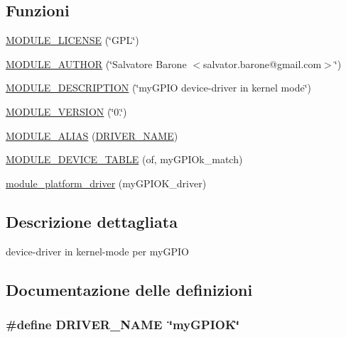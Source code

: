 \subsection*{Funzioni}
\begin{DoxyCompactItemize}
\item 
\hyperlink{group___kernel-module_gad94b36675e7eb067ea3ce6ff9e244a44}{M\+O\+D\+U\+L\+E\+\_\+\+L\+I\+C\+E\+N\+S\+E} (\char`\"{}G\+P\+L\char`\"{})
\item 
\hyperlink{group___kernel-module_gaa528ef168ff30340d38c46a12fce906b}{M\+O\+D\+U\+L\+E\+\_\+\+A\+U\+T\+H\+O\+R} (\char`\"{}Salvatore Barone $<$salvator.\+barone@gmail.\+com$>$\char`\"{})
\item 
\hyperlink{group___kernel-module_ga1a0de0abbfec8f65abc50ccd3a549a4d}{M\+O\+D\+U\+L\+E\+\_\+\+D\+E\+S\+C\+R\+I\+P\+T\+I\+O\+N} (\char`\"{}my\+G\+P\+I\+O device-\/driver in kernel mode\char`\"{})
\item 
\hyperlink{group___kernel-module_ga4b75c2cb371865e62f06fc635df9401e}{M\+O\+D\+U\+L\+E\+\_\+\+V\+E\+R\+S\+I\+O\+N} (\char`\"{}0.\char`\"{})
\item 
\hyperlink{group___kernel-module_ga1681c4acdb2692baf523dbf58f940399}{M\+O\+D\+U\+L\+E\+\_\+\+A\+L\+I\+A\+S} (\hyperlink{group___kernel-module_ga25634d21648ca7fb7a2aca614bafaaeb}{D\+R\+I\+V\+E\+R\+\_\+\+N\+A\+M\+E})
\item 
\hyperlink{group___kernel-module_ga4982cc224a0881ae5d106fce7526fb68}{M\+O\+D\+U\+L\+E\+\_\+\+D\+E\+V\+I\+C\+E\+\_\+\+T\+A\+B\+L\+E} (of, my\+G\+P\+I\+Ok\+\_\+match)
\item 
\hyperlink{group___kernel-module_ga61e890be90fe5582db8048893ca0ebbf}{module\+\_\+platform\+\_\+driver} (my\+G\+P\+I\+O\+K\+\_\+driver)
\end{DoxyCompactItemize}


\subsection{Descrizione dettagliata}
device-\/driver in kernel-\/mode per my\+G\+P\+I\+O 



\subsection{Documentazione delle definizioni}
\hypertarget{group___kernel-module_ga25634d21648ca7fb7a2aca614bafaaeb}{
\subsubsection[{D\+R\+I\+V\+E\+R\+\_\+\+N\+A\+M\+E}]{\setlength{\rightskip}{0pt plus 5cm}\#define D\+R\+I\+V\+E\+R\+\_\+\+N\+A\+M\+E~\char`\"{}my\+G\+P\+I\+O\+K\char`\"{}}}\label{group___kernel-module_ga25634d21648ca7fb7a2aca614bafaaeb}


